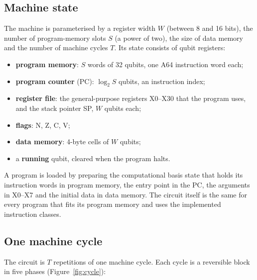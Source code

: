 \documentclass[11pt]{article}
\begin{document}
\subsection{Machine state}

The machine is parameterised by a register width $W$ (between 8 and 16 bits), the number of
program-memory slots $S$ (a power of two), the size of data memory and the number of machine
cycles $T$. Its state consists of qubit registers:
\begin{itemize}
  \item \textbf{program memory}: $S$ words of 32 qubits, one A64 instruction word each;
  \item \textbf{program counter} (PC): $\log_2 S$ qubits, an instruction index;
  \item \textbf{register file}: the general-purpose registers X0--X30 that the program uses,
        and the stack pointer SP, $W$ qubits each;
  \item \textbf{flags}: N, Z, C, V;
  \item \textbf{data memory}: 4-byte cells of $W$ qubits;
  \item a \textbf{running} qubit, cleared when the program halts.
\end{itemize}
A program is loaded by preparing the computational basis state that holds its instruction
words in program memory, the entry point in the PC, the arguments in X0--X7 and the initial
data in data memory. The circuit itself is the same for every program that fits its program
memory and uses the implemented instruction classes.

\subsection{One machine cycle}

The circuit is $T$ repetitions of one machine cycle. Each cycle is a reversible block in five
phases (Figure~\ref{fig:cycle}):
\end{document}
